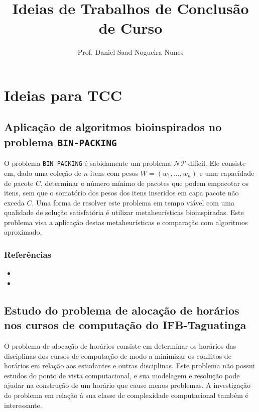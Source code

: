 \documentclass{article}
\author{Prof. Daniel Saad Nogueira Nunes}
\title{Ideias de Trabalhos de Conclusão de Curso}
\date{}
\newcommand*{\nsubsection}[1]{
    \subsection{#1}
}
\begin{document}
\maketitle
\setcounter{tocdepth}{2}
\setcounter{secnumdepth}{2}
\tableofcontents
{}	


\newpage


\section{Ideias para TCC}


\nsubsection{Aplicação de algoritmos bioinspirados no problema {\tt BIN-PACKING}}

O problema {\tt BIN-PACKING} é sabidamente um problema $\mathcal{N\!P}$-difícil. Ele consiste em, dado uma coleção de $n$ itens com pesos $W=(w_1,\ldots,w_n)$ e uma capacidade de pacote $C$, determinar o número mínimo de pacotes que podem empacotar os itens, sem que o somatório dos pesos dos itens inseridos em capa pacote não exceda $C$. Uma forma de resolver este problema em tempo viável com uma qualidade de solução satisfatória é utilizar metaheurísticas bioinspiradas. Este problema visa a aplicação destas metaheurísticas e comparação com algoritmos aproximado.


\subsubsection*{Referências}

\begin{itemize}
	\item {}
	\item {}
\end{itemize}



\nsubsection{Estudo do problema de alocação de horários nos cursos de computação do IFB-Taguatinga}

O problema de alocação de horários consiste em determinar os horários das disciplinas dos cursos de computação de modo a minimizar os conflitos de horários em relação aos estudantes e outras disciplinas. Este problema não possui estudos do ponto de vista computacional, e sua modelagem e resolução pode ajudar na construção de um horário que cause menos problemas. A investigação do problema em relação à sua classe de complexidade computacional também é interessante. 
\end{document}
